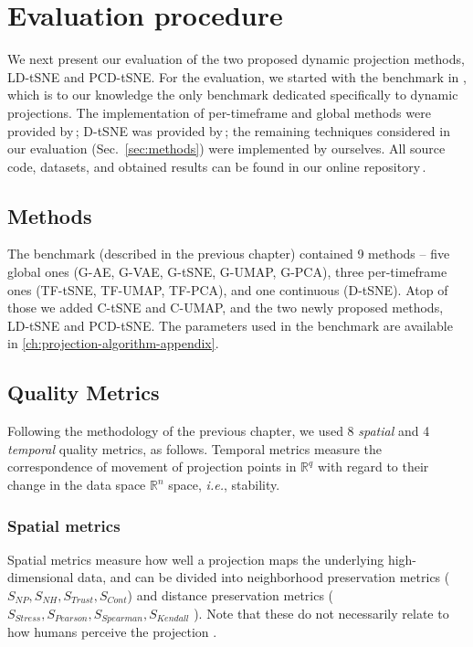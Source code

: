 \section{Evaluation procedure} 
\label{sec:experimental-setup}
%
We next present our evaluation of the two proposed dynamic projection methods, LD-tSNE and PCD-tSNE. For the evaluation, we started with the benchmark in \cite{Vernier2020}, which is to our knowledge the only benchmark dedicated specifically to dynamic projections. The implementation of per-timeframe and global methods were provided by\,\cite{Vernier2020}; D-tSNE was provided by\,\cite{Rauber2016};  the remaining techniques considered in our evaluation (Sec.~\ref{sec:methods}) were implemented by ourselves. All source code, datasets, and obtained results can be found in our online repository\,\citep{repo-guided}. 

\subsection{Methods}
\label{sec:eval-methods}

The \cite{Vernier2020} benchmark (described in the previous chapter) contained 9 methods -- five global ones (G-AE, G-VAE, G-tSNE, G-UMAP, G-PCA), three per-timeframe ones (TF-tSNE, TF-UMAP, TF-PCA), and one continuous (D-tSNE).  Atop of those we added C-tSNE and C-UMAP, and the two newly proposed methods, LD-tSNE and PCD-tSNE. The parameters used in the benchmark are available in \cref{ch:projection-algorithm-appendix}.

\subsection{Quality Metrics}
\label{sec:metrics}
%
Following the methodology of the previous chapter, we used 8 \emph{spatial} and 4 \emph{temporal} quality metrics, as follows. Temporal metrics measure the correspondence of movement of projection points in $\mathbb{R}^q$ with regard to their change in the data space $\mathbb{R}^n$ space, \emph{i.e.}, stability. 

\subsubsection{Spatial metrics}
\label{sec:spatial}

Spatial metrics measure how well a projection maps the underlying high-dimensional data, and can be divided into neighborhood preservation metrics ($S_{NP}, S_{NH}, S_{Trust}, S_{Cont}$) and distance preservation metrics ($S_{Stress}, S_{Pearson}, S_{Spearman}, S_{Kendall}$ ). Note that these do not necessarily relate to how humans perceive the projection \citep{Wang2018}.\\

